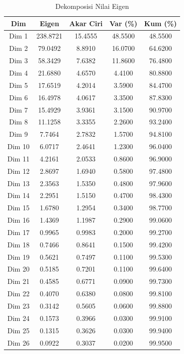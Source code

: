 \begin{table}[H]
\centering
\caption{Dekomposisi Nilai Eigen} \label{tab:eigen}
\begin{tabular}{|c|c|c|c|c|}
\hline
\textbf{Dim} & \textbf{Eigen} & \textbf{Akar Ciri} & \textbf{Var (\%)} & \textbf{Kum (\%)} \\
\hline
Dim 1 & 238.8721 & 15.4555 & 48.5500 & 48.5500 \\
Dim 2 & 79.0492 & 8.8910 & 16.0700 & 64.6200 \\
Dim 3 & 58.3429 & 7.6382 & 11.8600 & 76.4800 \\
Dim 4 & 21.6880 & 4.6570 & 4.4100 & 80.8800 \\
Dim 5 & 17.6519 & 4.2014 & 3.5900 & 84.4700 \\
Dim 6 & 16.4978 & 4.0617 & 3.3500 & 87.8300 \\
Dim 7 & 15.4929 & 3.9361 & 3.1500 & 90.9700 \\
Dim 8 & 11.1258 & 3.3355 & 2.2600 & 93.2400 \\
Dim 9 & 7.7464 & 2.7832 & 1.5700 & 94.8100 \\
Dim 10 & 6.0717 & 2.4641 & 1.2300 & 96.0400 \\
Dim 11 & 4.2161 & 2.0533 & 0.8600 & 96.9000 \\
Dim 12 & 2.8697 & 1.6940 & 0.5800 & 97.4800 \\
Dim 13 & 2.3563 & 1.5350 & 0.4800 & 97.9600 \\
Dim 14 & 2.2951 & 1.5150 & 0.4700 & 98.4300 \\
Dim 15 & 1.6780 & 1.2954 & 0.3400 & 98.7700 \\
Dim 16 & 1.4369 & 1.1987 & 0.2900 & 99.0600 \\
Dim 17 & 0.9965 & 0.9983 & 0.2000 & 99.2700 \\
Dim 18 & 0.7466 & 0.8641 & 0.1500 & 99.4200 \\
Dim 19 & 0.5621 & 0.7497 & 0.1100 & 99.5300 \\
Dim 20 & 0.5185 & 0.7201 & 0.1100 & 99.6400 \\
Dim 21 & 0.4585 & 0.6771 & 0.0900 & 99.7300 \\
Dim 22 & 0.4070 & 0.6380 & 0.0800 & 99.8100 \\
Dim 23 & 0.3142 & 0.5605 & 0.0600 & 99.8800 \\
Dim 24 & 0.1573 & 0.3966 & 0.0300 & 99.9100 \\
Dim 25 & 0.1315 & 0.3626 & 0.0300 & 99.9400 \\
Dim 26 & 0.0922 & 0.3037 & 0.0200 & 99.9500 \\

\end{tabular}
\end{table}
